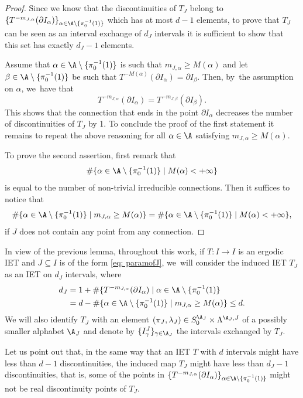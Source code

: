 \skpt
\begin{proof}
Since we know that the discontinuities of $T_J$ belong to $\{T^{-m_{J,\alpha}}(\partial I_{\alpha})\}_{\alpha\in \A\setminus \{\pi_0^{-1}(1)\}}$ which has at most $d-1$ elements, to prove that $T_J$ can be seen as an interval exchange of $d_J$ intervals it is sufficient to show that this set has exactly $d_J-1$ elements.

Assume that $\alpha\in\A\setminus \{\pi_0^{-1}(1)\}$ is such that $m_{J,\alpha}\ge M(\alpha)$ and let $\beta\in \A\setminus \{\pi_0^{-1}(1)\}$ be such that $T^{-M(\alpha)}(\partial I_{\alpha})=\partial I_{\beta}$. Then, by~the assumption on $\alpha$, we~have that
\[
T^{-m_{J,\alpha}}(\partial I_{\alpha})=T^{-m_{J,\beta}}(\partial I_{\beta}).
\]
This shows that the connection that ends in the point $\partial I_{\alpha}$ decreases the number of discontinuities of $T_J$ by 1.
To conclude the proof of the first statement it remains to repeat the above reasoning for all $\alpha\in\A$ satisfying $m_{J,\alpha}\ge M(\alpha)$.

To prove the second assertion, first remark that
\[
\#\{\alpha\in\A\setminus \{\pi_0^{-1}(1)\} \mid M(\alpha) < +\infty\}
\]
is equal to the number of non-trivial irreducible connections. Then it suffices to notice that
\[
\#\{\alpha\in\A\setminus \{\pi_0^{-1}(1)\} \mid m_{J,\alpha}\ge M(\alpha)\} = \#\{\alpha\in\A\setminus \{\pi_0^{-1}(1)\} \mid M(\alpha) < +\infty\},
\]
if $J$ does not contain any point from any connection.
\end{proof}

In view of the previous lemma, throughout this work, if $T: I \to I$ is an ergodic IET and $J \subseteq I$ is of the form \eqref{eq: paramofJ}, we~will consider the induced IET $T_J$ as an IET on $d_J$ intervals, where
\begin{align*}
d_J &= 1 + \# \{T^{-m_{J,\alpha}}(\partial I_{\alpha}) \mid \alpha\in \A\setminus \{\pi_0^{-1}(1)\}\\
&= d -\#\{\alpha\in\A\setminus \{\pi_0^{-1}(1)\} \mid m_{J,\alpha}\ge M(\alpha)\} \leq d.
\end{align*}
We will also identify $T_J$ with an element $(\pi_J, \lambda_J) \in S_0^{\A_J} \times \Lambda^{\A_J, J}$ of a possibly smaller alphabet $\A_J$ and denote by $\{I_\gamma^J\}_{\gamma \in \A_J}$ the intervals exchanged by $T_J$.

Let us point out that, in the same way that an IET $T$ with $d$ intervals might have less than $d - 1$ discontinuities, the induced map $T_J$ might have less than $d_J - 1$ discontinuities, that is, some of the points in $
\{T^{-m_{J,\alpha}}(\partial I_{\alpha})\}_{\alpha\in \A\setminus \{\pi_0^{-1}(1)\}}$ might not be real discontinuity points of $T_J$.

